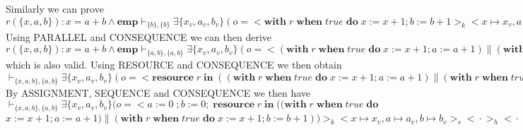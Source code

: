 \documentclass{lmcs} %
\theoremstyle{plain}\newtheorem{satz}[thm]{Satz} %
\begin{document}
\begin{enumerate}
 Similarly we can prove\\
 $r(\{x,a,b\}):x=a+b \land\mathbf{emp} \vdash_{\{b\},\{b\}}\exists \{x_v,a_v,b_v\}(o=<\!\!\mathbf{with}\;r\;\mathbf{when}\;true\;\mathbf{do}\;x:=x+1;b:=b+1\!\!>_k<\!\!x\mapsto x_v,a\mapsto a_v,b\mapsto b_v\!\!>_s<\!\!\cdot\!\!>_h<\!\!\cdot\!\!>_r\land b=0\land\mathbf{emp})\Downarrow\exists \{x_v,a_v,b_v\}(o=<\!\!\cdot\!\!>_k<\!\!x\mapsto x_v+2,a\mapsto a_v+1,b\mapsto b_v+1\!\!>_s<\!\!\cdot\!\!>_h<\!\!\cdot\!\!>_r\land b=1\land\mathbf{emp})$\\
  Using PARALLEL and CONSEQUENCE we can then derive\\
  $r(\{x,a,b\}):x=a+b \land\mathbf{emp} \vdash_{\{a,b\},\{a,b\}}\exists \{x_v,a_v,b_v\}(o=<\!\!(\mathbf{with}\;r\;\mathbf{when}\;true\;\mathbf{do}\;x:=x+1;a:=a+1)\parallel(\mathbf{with}\;r\;\mathbf{when}\;true\;\mathbf{do}\;x:=x+1;b:=b+1)\!\!>_k<\!\!x\mapsto x_v,a\mapsto a_v,b\mapsto b_v\!\!>_s<\!\!\cdot\!\!>_h<\!\!\cdot\!\!>_r\land a=0\land b=0\land\mathbf{emp})\Downarrow\exists \{x_v,a_v,b_v\}(o=<\!\!\cdot\!\!>_k<\!\!x\mapsto x_v+2,a\mapsto a_v+1,b\mapsto b_v+1\!\!>_s<\!\!\cdot\!\!>_h<\!\!\cdot\!\!>_r\land a=1\land b=1\land\mathbf{emp})$\\
  which is also valid. Using RESOURCE and CONSEQUENCE we then obtain\\
  $\vdash_{\{x,a,b\},\{a,b\}}\exists \{x_v,a_v,b_v\}(o=<\!\!\mathbf{resource}\;r\;\mathbf{in}\;((\mathbf{with}\;r\;\mathbf{when}\;true\;\mathbf{do}\;x:=x+1;a:=a+1)\parallel(\mathbf{with}\;r\;\mathbf{when}\;true\;\mathbf{do}\;x:=x+1;b:=b+1))\!\!>_k<\!\!x\mapsto x_v,a\mapsto a_v,b\mapsto b_v\!\!>_s<\!\!\cdot\!\!>_h<\!\!\cdot\!\!>_r\land x=a+b \land a=0\land b=0\land\mathbf{emp})\Downarrow\exists \{x_v,a_v,b_v\}(o=<\!\!\cdot\!\!>_k<\!\!x\mapsto x_v+2,a\mapsto a_v+1,b\mapsto b_v+1\!\!>_s<\!\!\cdot\!\!>_h<\!\!\cdot\!\!>_r\land x=a+b\land a=1\land b=1\land\mathbf{emp})$\\
  By ASSIGNMENT, SEQUENCE and CONSEQUENCE we then have\\
  $\vdash_{\{x,a,b\},\{a,b\}}\exists \{x_v,a_v,b_v\}(o=<\!\!a:=0\; ; b:=0;\;\mathbf{resource}\;r\;\mathbf{in}\;((\mathbf{with}\;r\;\mathbf{when}\;true\;\mathbf{do}$\\$x:=x+1;a:=a+1)\parallel(\mathbf{with}\;r\;\mathbf{when}\;true\;\mathbf{do}\;x:=x+1;b:=b+1))\!\!>_k<\!\!x\mapsto x_v,a\mapsto a_v,b\mapsto b_v\!\!>_s<\!\!\cdot\!\!>_h<\!\!\cdot\!\!>_r\land x=0\land\mathbf{emp})\Downarrow\exists \{x_v,a_v,b_v\}(o=<\!\!\cdot\!\!>_k<\!\!x\mapsto x_v+2,a\mapsto a_v+1,b\mapsto b_v+1\!\!>_s<\!\!\cdot\!\!>_h<\!\!\cdot\!\!>_r\land x=2\land\mathbf{emp})$\\

\end{enumerate}
\end{document}
